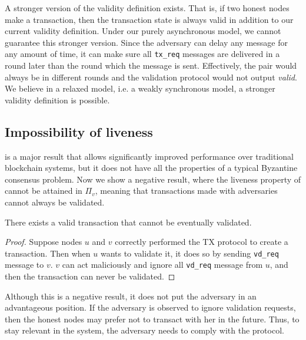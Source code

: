 A stronger version of the validity definition exists.
That is, if two honest nodes make a transaction,
then the transaction state is always valid in addition to our current validity definition.
Under our purely asynchronous model, we cannot guarantee this stronger version.
Since the adversary can delay any message for any amount of time,
it can make sure all \texttt{tx\_req} messages are delivered in a round later than the round which the message is sent.
Effectively, the pair would always be in different rounds and the validation protocol would not output \emph{valid}.
We believe in a relaxed model, i.e. a weakly synchronous model, a stronger validity definition is possible.

\subsection{Impossibility of liveness}
 is a major result that allows significantly improved performance over traditional blockchain systems,
but it does not have all the properties of a typical Byzantine consensus problem.
Now we show a negative result, where the liveness property of  cannot be attained in $\Pi_v$,
meaning that transactions made with adversaries cannot always be validated.

\begin{lemma}
There exists a valid transaction that cannot be eventually validated.
\end{lemma}
\begin{proof}
Suppose nodes $u$ and $v$ correctly performed the TX protocol to create a transaction.
Then when $u$ wants to validate it, it does so by sending \texttt{vd\_req} message to $v$.
$v$ can act maliciously and ignore all \texttt{vd\_req} message from $u$, and then the transaction can never be validated.
\end{proof}
Although this is a negative result, it does not put the adversary in an advantageous position.
If the adversary is observed to ignore validation requests, then the honest nodes may prefer not to transact with her in the future.
Thus, to stay relevant in the system, the adversary needs to comply with the protocol.


